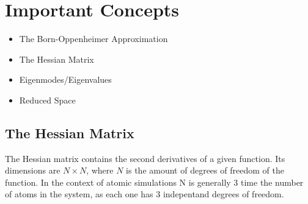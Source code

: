 \section{Important Concepts}
\begin{itemize}
\item The Born-Oppenheimer Approximation
\item The Hessian Matrix
\item Eigenmodes/Eigenvalues
\item Reduced Space
\end{itemize}

\subsection{The Hessian Matrix}
The Hessian matrix contains the second derivatives of a given function.
Its dimensions are $N\times N$, where $N$ is the amount of degrees of freedom of the function.
In the context of atomic simulations N is generally 3 time the number of atoms in the system, as each one has 3 indepentand degrees of freedom.
